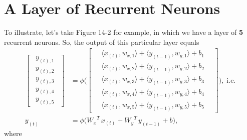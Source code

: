 \documentclass{article}
\begin{document}
\section{A Layer of Recurrent Neurons}
To illustrate, let's take Figure 14-2 for example, in which we have a layer of \textbf{5} recurrent neurons. So,
the output of this particular layer equals
\begin{align*}
  \begin{bmatrix}
    \;\,y_{(t), 1} \;\, \\
    \;\,y_{(t), 2} \;\, \\
    \;\,y_{(t), 3} \;\, \\
    \;\,y_{(t), 4} \;\, \\
    \;\,y_{(t), 5} \;\,
  \end{bmatrix}
  &= \phi
  \Bigg(\begin{bmatrix}
    \quad\langle x_{(t)}, w_{x, 1} \rangle
    + \langle y_{(t-1)}, w_{y, 1} \rangle
    + b_1
    \quad
    \\
    \quad\langle x_{(t)}, w_{x, 2} \rangle
    + \langle y_{(t-1)}, w_{y, 2} \rangle
    + b_2
    \quad
    \\
    \quad\langle x_{(t)}, w_{x, 3} \rangle
    + \langle y_{(t-1)}, w_{y, 3} \rangle
    + b_3
    \quad
    \\
    \quad\langle x_{(t)}, w_{x, 4} \rangle
    + \langle y_{(t-1)}, w_{y, 4} \rangle
    + b_4
    \quad
    \\
    \quad\langle x_{(t)}, w_{x, 5} \rangle
    + \langle y_{(t-1)}, w_{y, 5} \rangle
    + b_5
    \quad
  \end{bmatrix}\Bigg), \;\text{i.e.} \\
  y_{(t)} &= \phi\bigg(
    {W_{x}}^{T}\, x_{(t)} + {W_{y}}^{T}\, y_{(t-1)} + b
  \bigg),
\end{align*}
where
\end{document}
